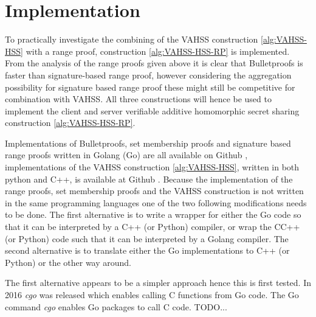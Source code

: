 
\section{Implementation}
To practically investigate the combining of the VAHSS construction \ref{alg:VAHSS-HSS} with a range proof, construction \ref{alg:VAHSS-HSS-RP} is implemented. %
 From the analysis of the range proofs given above it is clear that Bulletproofs is faster than signature-based range proof, however considering the aggregation possibility for signature based range proof these might still be competitive for combination with VAHSS.  All three constructions will hence be used to implement the client and server verifiable additive homomorphic secret sharing construction \ref{alg:VAHSS-HSS-RP}. 

Implementations of Bulletproofs, set membership proofs and signature based range proofs written in Golang (Go) are all available on Github \cite{Git:RP}, implementations of the VAHSS construction \ref{alg:VAHSS-HSS}, written in both python and C++, is available at Github \cite{Git:python_vahss} \cite{Git:C_vahss}.
Because the implementation of the range proofs, set membership proofs and the VAHSS construction is not written in the same programming languages one of the two following modifications needs to be done. The first alternative is to write a wrapper for either the Go code so that it can be interpreted by a C++ (or Python) compiler, or wrap the CC++ (or Python) code such that it can be interpreted by a Golang compiler. The second alternative is to translate either the Go implementations to C++ (or Python) or the other way around. 

The first alternative appears to be a simpler approach hence this is first tested. In 2016 \textit{cgo} was released which enables calling C functions from Go code. 
The Go command \textit{cgo} enables Go packages to call C code. TODO...

